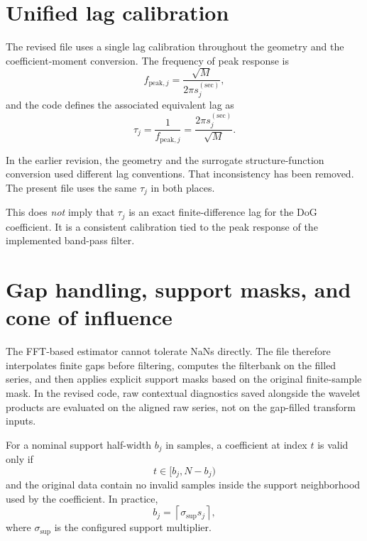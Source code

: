 \documentclass[11pt]{article}
\begin{document}
\section{Unified lag calibration}

The revised file uses a single lag calibration throughout the geometry and the coefficient-moment conversion. The frequency of peak response is
\begin{equation}
 f_{\mathrm{peak},j} = \frac{\sqrt{M}}{2\pi s_j^{(\mathrm{sec})}},
\end{equation}
and the code defines the associated equivalent lag as
\begin{equation}
 \tau_j = \frac{1}{f_{\mathrm{peak},j}} = \frac{2\pi s_j^{(\mathrm{sec})}}{\sqrt{M}}.
\end{equation}

In the earlier revision, the geometry and the surrogate structure-function conversion used different lag conventions. That inconsistency has been removed. The present file uses the same $\tau_j$ in both places.

This does \emph{not} imply that $\tau_j$ is an exact finite-difference lag for the DoG coefficient. It is a consistent calibration tied to the peak response of the implemented band-pass filter.

\section{Gap handling, support masks, and cone of influence}

The FFT-based estimator cannot tolerate NaNs directly. The file therefore interpolates finite gaps before filtering, computes the filterbank on the filled series, and then applies explicit support masks based on the original finite-sample mask. In the revised code, raw contextual diagnostics saved alongside the wavelet products are evaluated on the aligned raw series, not on the gap-filled transform inputs.

For a nominal support half-width $b_j$ in samples, a coefficient at index $t$ is valid only if
\begin{equation}
 t \in [b_j, N-b_j)
\end{equation}
and the original data contain no invalid samples inside the support neighborhood used by the coefficient. In practice,
\begin{equation}
 b_j = \left\lceil \sigma_{\mathrm{sup}} s_j \right\rceil,
\end{equation}
where $\sigma_{\mathrm{sup}}$ is the configured support multiplier.
\end{document}
